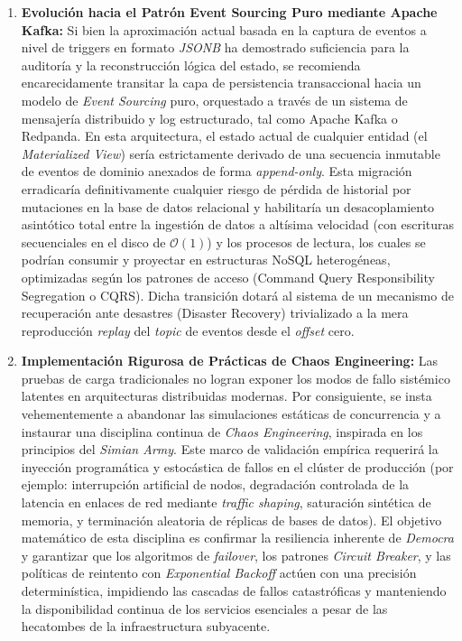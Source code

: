 \begin{enumerate}
    \item \textbf{Evolución hacia el Patrón Event Sourcing Puro mediante Apache Kafka:}
    Si bien la aproximación actual basada en la captura de eventos a nivel de triggers en formato \textit{JSONB} ha demostrado suficiencia para la auditoría y la reconstrucción lógica del estado, se recomienda encarecidamente transitar la capa de persistencia transaccional hacia un modelo de \textit{Event Sourcing} puro, orquestado a través de un sistema de mensajería distribuido y log estructurado, tal como Apache Kafka o Redpanda. En esta arquitectura, el estado actual de cualquier entidad (el \textit{Materialized View}) sería estrictamente derivado de una secuencia inmutable de eventos de dominio anexados de forma \textit{append-only}. Esta migración erradicaría definitivamente cualquier riesgo de pérdida de historial por mutaciones en la base de datos relacional y habilitaría un desacoplamiento asintótico total entre la ingestión de datos a altísima velocidad (con escrituras secuenciales en el disco de $\mathcal{O}(1)$) y los procesos de lectura, los cuales se podrían consumir y proyectar en estructuras NoSQL heterogéneas, optimizadas según los patrones de acceso (Command Query Responsibility Segregation o CQRS). Dicha transición dotará al sistema de un mecanismo de recuperación ante desastres (Disaster Recovery) trivializado a la mera reproducción \textit{replay} del \textit{topic} de eventos desde el \textit{offset} cero.

    \item \textbf{Implementación Rigurosa de Prácticas de Chaos Engineering:}
    Las pruebas de carga tradicionales no logran exponer los modos de fallo sistémico latentes en arquitecturas distribuidas modernas. Por consiguiente, se insta vehementemente a abandonar las simulaciones estáticas de concurrencia y a instaurar una disciplina continua de \textit{Chaos Engineering}, inspirada en los principios del \textit{Simian Army}. Este marco de validación empírica requerirá la inyección programática y estocástica de fallos en el clúster de producción (por ejemplo: interrupción artificial de nodos, degradación controlada de la latencia en enlaces de red mediante \textit{traffic shaping}, saturación sintética de memoria, y terminación aleatoria de réplicas de bases de datos). El objetivo matemático de esta disciplina es confirmar la resiliencia inherente de \textit{Democra} y garantizar que los algoritmos de \textit{failover}, los patrones \textit{Circuit Breaker}, y las políticas de reintento con \textit{Exponential Backoff} actúen con una precisión determinística, impidiendo las cascadas de fallos catastróficas y manteniendo la disponibilidad continua de los servicios esenciales a pesar de las hecatombes de la infraestructura subyacente.


\end{enumerate}

